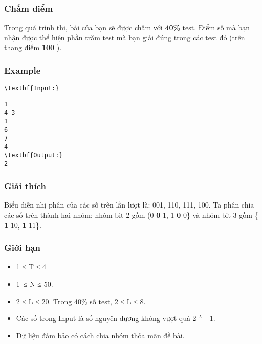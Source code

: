 \subsubsection{   Chấm điểm  }

   Trong quá trình thi, bài của bạn sẽ được chấm với   \textbf{    40\%   }   test. Điểm số mà bạn nhận được thể hiện phần trăm test mà bạn giải đúng trong các test đó (trên thang điểm   \textbf{    100   }   ).  

\subsubsection{   Example  }
\begin{verbatim}
\textbf{Input:}\end{verbatim}
\begin{verbatim}
1
4 3
1
6
7
4
\textbf{Output:}
2
\end{verbatim}

\subsubsection{   Giải thích  }

   Biểu diễn nhị phân của các số trên lần lượt là: 001, 110, 111, 100. Ta phân chia các số trên thành hai nhóm: nhóm bit-2 gồm (0   \textbf{    0   }   1, 1   \textbf{    0   }   0\} và nhóm bit-3 gồm \{   \textbf{    1   }   10,   \textbf{    1   }   11\}.  

\subsubsection{   Giới hạn  }
\begin{itemize}
	\item     1 ≤ T ≤ 4   
	\item     1 ≤ N ≤ 50.   
	\item     2 ≤ L ≤ 20. Trong 40\% số test, 2 ≤ L ≤ 8.   
	\item     Các số trong Input là số nguyên dương không vượt quá 2    $^     L    $    - 1.   
	\item     Dữ liệu đảm bảo có cách chia nhóm thỏa mãn đề bài.   
\end{itemize}